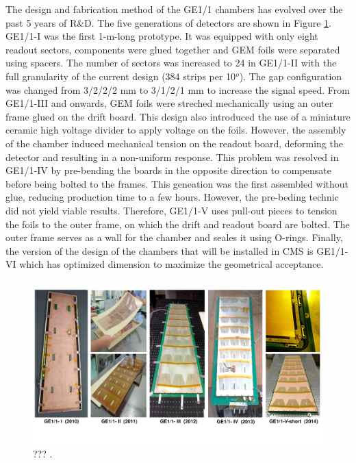     The design and fabrication method of the GE1/1 chambers has evolved over the past 5 years of R\&D. The five generations of detectors are shown in Figure \ref{fig:II-1-gem-generations}. GE1/1-I was the first 1-m-long prototype. It was equipped with only eight readout sectors, components were glued together and GEM foils were separated using spacers. The number of sectors was increased to 24 in GE1/1-II with the full granularity of the current design (384 strips per 10$^o$). The gap configuration was changed from 3/2/2/2 mm to 3/1/2/1 mm to increase the signal speed. From GE1/1-III and onwards, GEM foils were streched mechanically using an outer frame glued on the drift board. This design also introduced the use of a miniature ceramic high voltage divider to apply voltage on the foils. However, the assembly of the chamber induced mechanical tension on the readout board, deforming the detector and resulting in a non-uniform response. This problem was resolved in GE1/1-IV by pre-bending the boards in the opposite direction to compensate before being bolted to the frames. This geneation was the first assembled without glue, reducing production time to a few hours. However, the pre-beding technic did not yield viable results. Therefore, GE1/1-V uses pull-out pieces to tension the foils to the outer frame, on which the drift and readout board are bolted. The outer frame serves as a wall for the chamber and seales it using O-rings. Finally, the version of the design of the chambers that will be installed in CMS is GE1/1-VI which has optimized dimension to maximize the geometrical acceptance.

    \begin{figure}[h!]
      \centering
      \includegraphics[width=\textwidth]{img/II-1-gem/generations.pdf}
      \caption{??? \cite{Colaleo:2021453}.}
      \label{fig:II-1-gem-generations}
    \end{figure}

